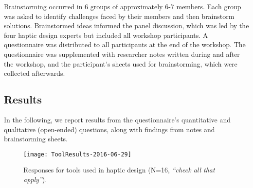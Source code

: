 Brainstorming occurred in 6 groups of approximately 6-7 members.
Each group was asked to identify challenges faced by their members and then brainstorm solutions.
Brainstormed ideas informed the panel discussion, which was led by the four haptic design experts but included all workshop participants.
A questionnaire was distributed to all participants at the end of the workshop.
The questionnaire was supplemented with researcher notes written during and after the workshop, and the participant's sheets used for brainstorming, which were collected afterwards.

\subsection{Results}
\noindent
In the following, we report results from the questionnaire's quantitative and qualitative (open-ended) questions, along with findings from notes and brainstorming sheets.

\begin{figure}[tb]
    \centering
    \texttt{[image: ToolResults-2016-06-29]}
    \caption{Responses for tools used in haptic design (N=16, \emph{``check all that apply''}).}
    \label{fig:questionnaire:toolcounts}
\end{figure}

